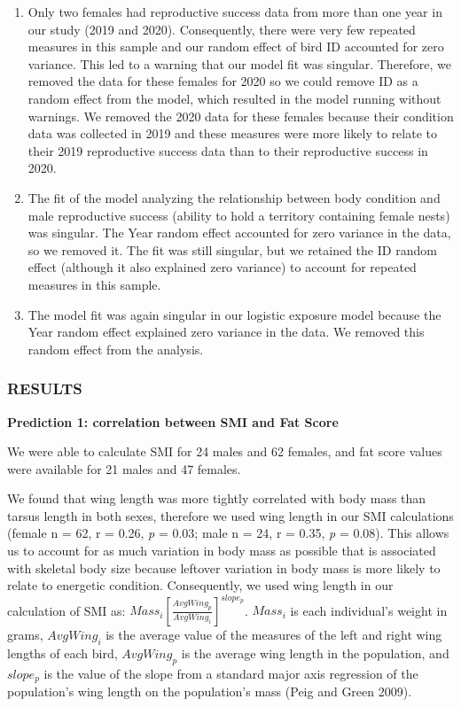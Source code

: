 \documentclass[
]{article}
\begin{document}
\begin{enumerate}
\def\labelenumi{\arabic{enumi})}
\setcounter{enumi}{5}
\item
  Only two females had reproductive success data from more than one year
  in our study (2019 and 2020). Consequently, there were very few
  repeated measures in this sample and our random effect of bird ID
  accounted for zero variance. This led to a warning that our model fit
  was singular. Therefore, we removed the data for these females for
  2020 so we could remove ID as a random effect from the model, which
  resulted in the model running without warnings. We removed the 2020
  data for these females because their condition data was collected in
  2019 and these measures were more likely to relate to their 2019
  reproductive success data than to their reproductive success in 2020.
\item
  The fit of the model analyzing the relationship between body condition
  and male reproductive success (ability to hold a territory containing
  female nests) was singular. The Year random effect accounted for zero
  variance in the data, so we removed it. The fit was still singular,
  but we retained the ID random effect (although it also explained zero
  variance) to account for repeated measures in this sample.
\item
  The model fit was again singular in our logistic exposure model
  because the Year random effect explained zero variance in the data. We
  removed this random effect from the analysis.
\end{enumerate}

\pagebreak

\hypertarget{results}{%
\subsubsection{RESULTS}\label{results}}

\textbf{Prediction 1: correlation between SMI and Fat Score}

We were able to calculate SMI for 24 males and 62 females, and fat score
values were available for 21 males and 47 females.

We found that wing length was more tightly correlated with body mass
than tarsus length in both sexes, therefore we used wing length in our
SMI calculations (female n = 62, r = 0.26, \emph{p} = 0.03; male n = 24,
r = 0.35, \emph{p} = 0.08). This allows us to account for as much
variation in body mass as possible that is associated with skeletal body
size because leftover variation in body mass is more likely to relate to
energetic condition. Consequently, we used wing length in our
calculation of SMI as:
\(Mass_i\left[ \frac{AvgWing_p}{AvgWing_i} \right]^{slope_p}\).
\(Mass_i\) is each individual's weight in grams, \(AvgWing_i\) is the
average value of the measures of the left and right wing lengths of each
bird, \(AvgWing_p\) is the average wing length in the population, and
\(slope_p\) is the value of the slope from a standard major axis
regression of the population's wing length on the population's mass
(Peig and Green 2009).
\end{document}
